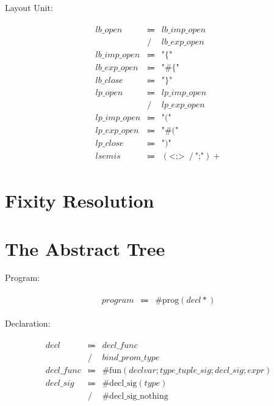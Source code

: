 Layout Unit:

\begin{align*}
    \begin{array}{rcll}
        \mathit{lb\_open}
        &\Coloneq &\mathit{lb\_imp\_open} \\
        &\mathrel{/} &\mathit{lb\_exp\_open} \\
        \mathit{lb\_imp\_open}
        &\Coloneq &\texttt{"\{"} \\
        \mathit{lb\_exp\_open}
        &\Coloneq &\texttt{"\#\{"} \\
        \mathit{lb\_close}
        &\Coloneq &\texttt{"\}"} \\
        \mathit{lp\_open}
        &\Coloneq &\mathit{lp\_imp\_open} \\
        &\mathrel{/} &\mathit{lp\_exp\_open} \\
        \mathit{lp\_imp\_open}
        &\Coloneq &\texttt{"("} \\
        \mathit{lp\_exp\_open}
        &\Coloneq &\texttt{"\#("} \\
        \mathit{lp\_close}
        &\Coloneq &\texttt{")"} \\
        \mathit{lsemis}
        &\Coloneq &(\texttt{<;>}\; \mathrel{/} \texttt{";"}){+}
    \end{array}
\end{align*}

\section{Fixity Resolution}

\section{The Abstract Tree}

Program:

\begin{align*}
    \begin{array}{rcll}
        \mathit{program}
        &\Coloneq &\mathrm{\#prog}(\mathit{decl}*)
    \end{array}
\end{align*}

Declaration:

\begin{align*}
    \begin{array}{rcll}
        \mathit{decl}
        &\Coloneq &\mathit{decl\_func} \\
        &\mathrel{/} &\mathit{bind\_prom\_type} \\
        \mathit{decl\_func}
        &\Coloneq &\mathrm{\#fun}(\mathit{declvar}; \mathit{type\_tuple\_sig}; \mathit{decl\_sig}; \mathit{expr}) \\
        \mathit{decl\_sig}
        &\Coloneq &\mathrm{\#decl\_sig}(\mathit{type}) \\
        &\mathrel{/} &\mathrm{\#decl\_sig\_nothing}
    \end{array}
\end{align*}

